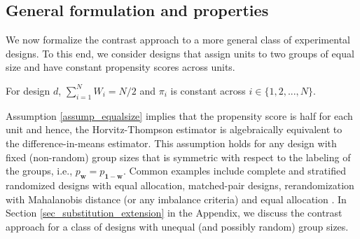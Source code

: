 \documentclass[12pt]{article}
\begin{document}
\subsection{General formulation and properties}
\label{sec_substitution_general}

We now formalize the contrast approach to a more general class of experimental designs. To this end, we consider designs that assign units to two groups of equal size and have constant propensity scores across units.
\begin{assumption} \normalfont
    For design $d$, $\sum_{i=1}^{N}W_i = N/2$ and $\pi_i$ is constant across $i \in \{1,2,...,N\}$. \label{assump_equalsize}
\end{assumption}
Assumption \ref{assump_equalsize} implies that the propensity score is half for each unit and hence, the Horvitz-Thompson estimator is algebraically equivalent to the difference-in-means estimator.
This assumption holds for any design with fixed (non-random) group sizes that is symmetric with respect to the labeling of the groups, i.e., $p_{\bm{w}} = p_{\bm{1} - \bm{w}}$. Common examples include complete and stratified randomized designs with equal allocation, matched-pair designs, rerandomization with Mahalanobis distance (or any imbalance criteria) and equal allocation \cite{morgan2012rerandomization}. 
In Section \ref{sec_substitution_extension} in the Appendix, we discuss the contrast approach for a class of designs with unequal (and possibly random) group sizes.
\end{document}
